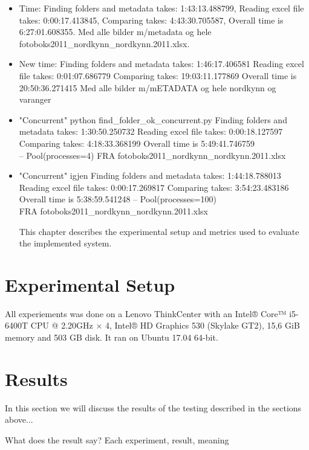 \documentclass[USenglish]{uit-thesis}
\begin{document}
\begin{itemize}

\item Time: Finding folders and metadata takes:  1:43:13.488799,
Reading excel file takes:  0:00:17.413845,
Comparing takes:  4:43:30.705587,
Overall time is  6:27:01.608355.
Med alle bilder m/metadata og hele fotoboks2011\_nordkynn\_nordkynn.2011.xlsx.

\item New time: Finding folders and metadata takes:  1:46:17.406581
Reading excel file takes:  0:01:07.686779
Comparing takes:  19:03:11.177869
Overall time is  20:50:36.271415
Med alle bilder m/mETADATA og hele nordkynn og varanger

\item "Concurrent" python find\_folder\_ok\_concurrent.py 
Finding folders and metadata takes:  1:30:50.250732
Reading excel file takes:  0:00:18.127597
Comparing takes:  4:18:33.368199
Overall time is  5:49:41.746759
\\ -- Pool(processes=4)
FRA fotoboks2011\_nordkynn\_nordkynn.2011.xlsx

\item "Concurrent" igjen
Finding folders and metadata takes:  1:44:18.788013
Reading excel file takes:  0:00:17.269817
Comparing takes:  3:54:23.483186
Overall time is  5:38:59.541248
-- Pool(processes=100)
\\ FRA fotoboks2011\_nordkynn\_nordkynn.2011.xlsx

This chapter describes the experimental setup and metrics used to evaluate the implemented system. 

\end{itemize}
\section{Experimental Setup}
All experiements was done on a Lenovo ThinkCenter with an Intel® Core™ i5-6400T CPU @ 2.20GHz × 4, Intel® HD Graphics 530 (Skylake GT2), 15,6 GiB memory and 503 GB disk. It ran on Ubuntu 17.04 64-bit.


\section{Results}
In this section we will discuss the results of the testing described in the sections above...

What does the result say?
Each experiment, result, meaning
\end{document}
